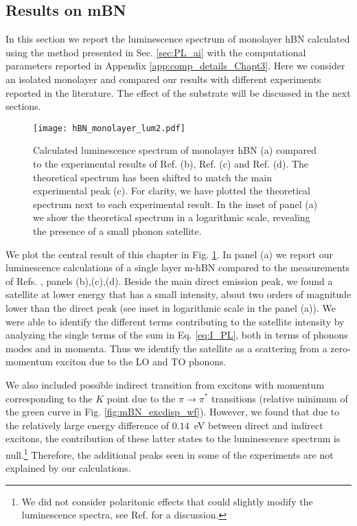\subsection{Results on mBN}
In this section we report the luminescence spectrum of monolayer hBN calculated using the method presented in Sec. \ref{sec:PL_ai} with the computational parameters reported in Appendix \ref{app:comp_details_Chapt3}. Here we consider an isolated monolayer and compared our results with different experiments reported in the literature. The effect of the substrate will be discussed in the next sections.
\begin{figure}[H]
	\vspace{0.2cm}
	\setcapindent{2em}
	\centering
	\texttt{[image: hBN\_monolayer\_lum2.pdf]}
	\caption{Calculated luminescence spectrum of monolayer hBN (a) compared to the experimental results of Ref. \cite{elias2019direct}(b), Ref. \cite{rousseau2021monolayer}(c) and Ref. \cite{wang2022scalable}(d). The theoretical spectrum has been shifted to match the main experimental peak (c). For clarity, we have plotted the theoretical spectrum next to each experimental result. In the inset of panel (a) we show the theoretical spectrum in a logarithmic scale, revealing the presence of a small phonon satellite.} 
	\label{fig:mBN_PL} %
\end{figure}
We plot the central result of this chapter in Fig. \ref{fig:mBN_PL}. In panel (a) we report our luminescence calculations of a single layer m-hBN compared to the measurements of Refs. \cite{elias2019direct,wang2022scalable,rousseau2021monolayer}, panels (b),(c),(d). Beside the main direct emission peak, we found a satellite at lower energy that has a small intensity, about two orders of magnitude lower than the direct peak (see inset in logarithmic scale in the panel (a)). We were able to identify the different terms contributing to the satellite intensity by analyzing the single terms of the sum in Eq. \eqref{eq:I_PL}, both in terms of phonons modes and in momenta. Thus we identify the satellite as a scattering from a zero-momentum exciton due to the LO and TO phonons.

 We also included possible indirect transition from excitons with momentum corresponding to the $K$ point due to the $\pi \rightarrow \pi^*$ transitions (relative minimum of the green curve in Fig. \ref{fig:mBN_excdisp_wf}). However, we found that due to the relatively large energy difference of $0.14$~eV between direct and indirect excitons, the contribution of these latter states to the luminescence spectrum is null.\footnote{We did not consider polaritonic effects that could slightly modify the luminescence spectra, see Ref. \cite{henriques2019optical} for a discussion.} Therefore, the additional peaks seen in some of the experiments are not explained by our calculations.

